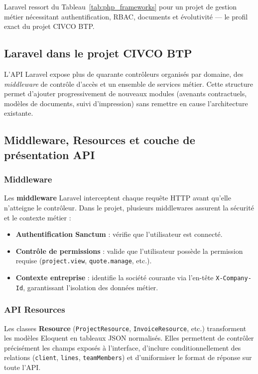 Laravel ressort du Tableau~\ref{tab:php_frameworks} pour un projet de gestion métier
nécessitant authentification, RBAC, documents et évolutivité --- le profil exact du
projet CIVCO BTP.

\subsection{Laravel dans le projet CIVCO BTP}

L'API Laravel expose plus de quarante contrôleurs organisés par domaine, des
\textit{middleware} de contrôle d'accès et un ensemble de services métier. Cette
structure permet d'ajouter progressivement de nouveaux modules (avenants contractuels,
modèles de documents, suivi d'impression) sans remettre en cause l'architecture
existante.

\subsection{Middleware, Resources et couche de présentation API}

\subsubsection{Middleware}

Les \textbf{middleware} Laravel interceptent chaque requête HTTP avant qu'elle
n'atteigne le contrôleur. Dans le projet, plusieurs middlewares assurent la
sécurité et le contexte métier :

\begin{itemize}
  \item \textbf{Authentification Sanctum} : vérifie que l'utilisateur est connecté.
  \item \textbf{Contrôle de permissions} : valide que l'utilisateur possède la
  permission requise (\texttt{project.view}, \texttt{quote.manage}, etc.).
  \item \textbf{Contexte entreprise} : identifie la société courante via l'en-tête
  \texttt{X-Company-Id}, garantissant l'isolation des données métier.
\end{itemize}

\subsubsection{API Resources}

Les classes \textbf{Resource} (\texttt{ProjectResource}, \texttt{InvoiceResource},
etc.) transforment les modèles Eloquent en tableaux JSON normalisés. Elles permettent
de contrôler précisément les champs exposés à l'interface, d'inclure conditionnellement
des relations (\texttt{client}, \texttt{lines}, \texttt{teamMembers}) et d'uniformiser
le format de réponse sur toute l'API.

